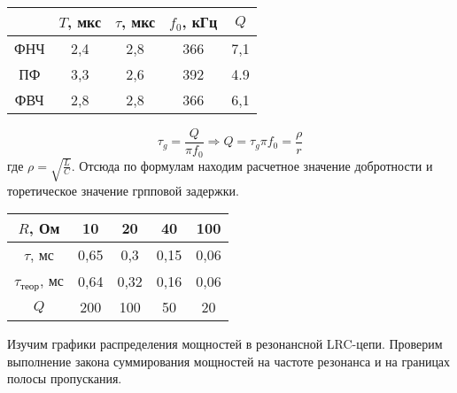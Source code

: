 	\begin{table}[h!]
		\begin{center}
			\begin{tabular}{|c|c|c|c|c|}
				\hline
						& $T$, мкс  & $\tau$, мкс  & $f_0$, кГц  & $Q$   \\ \hline
				ФНЧ 	& 2,4       & 2,8          & 366         & 7,1   \\ \hline
				ПФ  	& 3,3       & 2,6          & 392         & 4.9   \\ \hline
				ФВЧ 	& 2,8       & 2,8          & 366         & 6,1   \\ \hline
			\end{tabular}
		\end{center}
	\end{table}


	\begin{equation*}
		\tau_g = \frac{Q}{\pi f_0} \Rightarrow Q = \tau_g \pi f_0 = \frac{\rho}{r}
	\end{equation*}
	где $\rho = \sqrt{\frac{L}{C}}$. Отсюда по формулам находим расчетное значение добротности и торетическое значение грпповой задержки.

	\begin{table}[h!]
		\begin{center}
			\begin{tabular}{|c|c|c|c|c|}
				\hline
				$R$, Ом                     & 10    & 20   & 40   & 100  \\ \hline
				$\tau$, мс                  & 0,65  & 0,3  & 0,15 & 0,06 \\ \hline
				$\tau_{\text{теор}}$, мс    & 0,64  & 0,32 & 0,16 & 0,06 \\ \hline
				$Q$                         & 200   & 100  & 50   & 20   \\ \hline
			\end{tabular}
		\end{center}
	\end{table}


	\noindent Изучим графики распределения мощностей в резонансной
	LRC-цепи. Проверим выполнение закона суммирования мощностей на частоте резонанса
	и на границах полосы пропускания.

